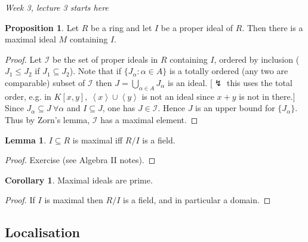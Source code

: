 \documentclass[a4paper]{article}
\newcommand{\la}{\left\langle}
\newcommand{\ra}{\right\rangle}
\theoremstyle{definition}
\newtheorem{prop}[defn]{Proposition}
\newtheorem{lemma}[defn]{Lemma}
\newtheorem{coro}[defn]{Corollary}
\begin{document}
\begin{flushright}
\textit{Week 3, lecture 3 starts here}
\end{flushright}

\begin{prop}
Let $R$ be a ring and let $I$ be a proper ideal of $R$. Then there is a maximal ideal $M$ containing $I$.
\end{prop}
\begin{proof}
Let $\mathcal I$ be the set of proper ideals in $R$ containing $I$, ordered by inclusion ($J_1\leq J_2$ if $J_1\subseteq J_2$). Note that if $\{J_\alpha:\alpha\in A\}$ is a totally ordered (any two are comparable) subset of $\mathcal I$ then $J=\bigcup_{\alpha\in A}J_\alpha$ is an ideal. [$\lightning$ this uses the total order, e.g. in $K[x,y],\ \la x\ra \cup\la y\ra$ is not an ideal since $x+y$ is not in there.] Since $J_\alpha\subseteq J \ \forall \alpha$ and $I\subseteq J$, one has $J\in \mathcal I$. Hence $J$ is an upper bound for $\{J_\alpha\}$. Thus by Zorn's lemma, $\mathcal I$ has a maximal element.
\end{proof}

\begin{lemma}
$I\subseteq R$ is maximal iff $R/I$ is a field.
\end{lemma}
\begin{proof}
Exercise (see Algebra II notes).
\end{proof}

\begin{coro}
Maximal ideals are prime.
\end{coro}
\begin{proof}
If $I$ is maximal then $R/I$ is a field, and in particular a domain.
\end{proof}

\subsection{Localisation}
\end{document}
